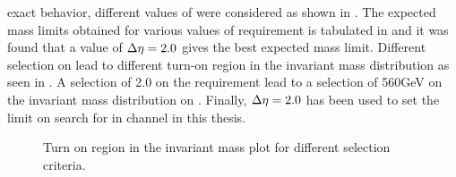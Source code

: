 exact behavior, different values of \deta were considered as shown in \fig{\ref{fig:OptExpectedDEtaB}}. The expected mass limits obtained for
various values of \deta requirement is tabulated in \tab{\ref{Table:optimization}} and it was found that a value of $\Delta\eta=2.0$ gives the best 
expected mass limit. 
Different selection on \deta lead to different turn-on region in the invariant mass distribution as seen in \fig{\ref{fig:OptimizeMassCut}}. A 
selection of 2.0 on the \deta requirement lead to a selection of 560\unit{GeV} on the invariant mass distribution on \gamjet.
Finally, $\Delta\eta=2.0$ has been used to set the limit on search for \qstar in \gamjet channel in this thesis.
\begin{figure}[h]
\centering
 \caption{Turn on region in the \gamjet invariant mass plot for different selection criteria.}
 \label{fig:OptimizeMassCut}
\end{figure}
